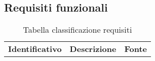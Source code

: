 \subsection{Requisiti funzionali}
\renewcommand{\arraystretch}{1.5}
\begin{longtable}{ c C{9cm} c }
    \caption{Tabella classificazione requisiti}\\
    \rowcolor{\primaryColor}
    \textcolor{\secondaryColor}{
    \textbf{Identificativo}} & \textcolor{\secondaryColor}{\textbf{Descrizione}}                                                            & \textcolor{\secondaryColor}
    {\textbf{Fonte}}                                                                                                                                                      \\



\end{longtable}
